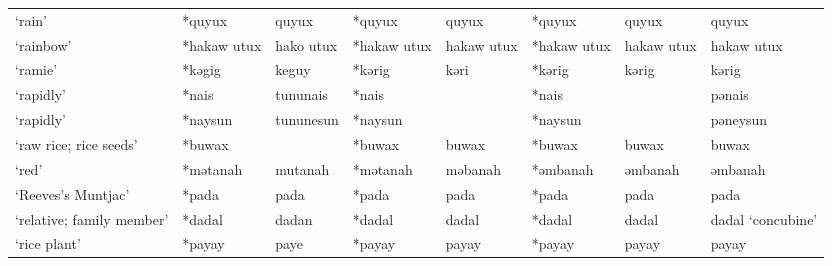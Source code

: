 \begin{landscape}
\begin{longtable}[c]{@{}p{3cm}<{\raggedright}p{2.75cm}<{\raggedright}p{2.75cm}<{\raggedright}p{2.75cm}<{\raggedright}p{2.75cm}<{\raggedright}p{2.75cm}<{\raggedright}p{2.75cm}<{\raggedright}p{2.75cm}<{\raggedright}@{}}
`rain'                                               & *quyux       & quyux                         & *quyux         & quyux                      & *quyux           & quyux                    & quyux                             \\
`rainbow'                                            & *hakaw utux  & hako utux                     & *hakaw utux    & hakaw utux                 & *hakaw utux      & hakaw utux               & hakaw utux                        \\
`ramie'                                              & *kəgig       & keguy                         & *kərig         & kəri                       & *kərig           & kərig                    & kərig                             \\
`rapidly'                                            & *nais        & tununais                      & *nais          &                            & *nais            &                          & pənais                            \\
`rapidly'                                            & *naysun      & tununesun                     & *naysun        &                            & *naysun          &                          & pəneysun                          \\
`raw rice; rice seeds'                               & *buwax       &                               & *buwax         & buwax                      & *buwax           & buwax                    & buwax                             \\
`red'                                                & *mətanah     & mutanah                       & *mətanah       & məbanah                    & *əmbanah         & əmbanah                  & əmbanah                           \\
`Reeves's Muntjac'                                   & *pada        & pada                          & *pada          & pada                       & *pada            & pada                     & pada                              \\
`relative; family member'                            & *dadal       & dadan                         & *dadal         & dadal                      & *dadal           & dadal                    & dadal `concubine'                 \\
`rice plant'                                         & *payay       & paye                          & *payay         & payay                      & *payay           & payay                    & payay                             \\

\end{longtable}
\end{landscape}
